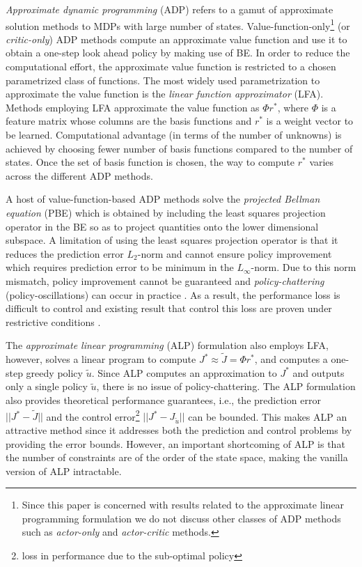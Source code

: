 \emph{Approximate dynamic programming} (ADP) \cite{dpchapter,powell} refers to a gamut of approximate solution methods to MDPs with large number of states. Value-function-only\footnote{Since this paper is concerned with results related to the approximate linear programming formulation we do not discuss other classes of ADP methods such as \emph{actor-only} and \emph{actor-critic} methods.} (or \emph{critic-only}) ADP methods compute an approximate value function and use it to obtain a one-step look ahead policy by making use of BE. In order to reduce the computational effort, the approximate value function is restricted to a chosen parametrized class of functions. The most widely used parametrization to approximate the value function is the \emph{linear function approximator} (LFA). Methods employing LFA approximate the value function as $\Phi r^*$, where $\Phi$ is a feature matrix whose columns are the basis functions and $r^*$ is a weight vector to be learned. Computational advantage (in terms of the number of unknowns) is achieved by choosing fewer number of basis functions compared to the number of states. Once the set of basis function is chosen, the way to compute $r^*$ varies across the different ADP methods.

A host of value-function-based ADP methods solve the \emph{projected Bellman equation} (PBE) which is obtained by including the least squares projection operator in the BE so as to project quantities onto the lower dimensional subspace. A limitation of using the least squares projection operator is that it reduces the prediction error $L_2$-norm and cannot ensure policy improvement which requires prediction error to be minimum in the $L_\infty$-norm. Due to this norm mismatch, policy improvement cannot be guaranteed and \emph{policy-chattering} (policy-oscillations) can occur in practice \cite{dpchapter}. As a result, the performance loss is difficult to control and existing result that control this loss are proven under restrictive conditions \cite{anszemu:mlj07,FaMuSz10}.

The \emph{approximate linear programming} (ALP) \cite{ALP,CS,SALP,ALP-Bor,gkp,fs,npalp} formulation also employs LFA, however, solves a linear program to compute $J^*\approx\tilde{J}=\Phi r^*$, and computes a one-step greedy policy $\tilde{u}$. Since ALP computes an approximation to $J^*$ and outputs only a single policy $\tilde{u}$, there is no issue of policy-chattering. The ALP formulation also provides theoretical performance guarantees, i.e., the prediction error $||J^*-\tilde{J}||$ and the control error\footnote{loss in performance due to the sub-optimal policy} $||J^*-J_{\tilde{u}}||$ can be bounded. This makes ALP an attractive method since it addresses both the prediction and control problems by providing the error bounds. However, an important shortcoming of ALP is that the number of constraints are of the order of the state space, making the vanilla version of ALP intractable.

